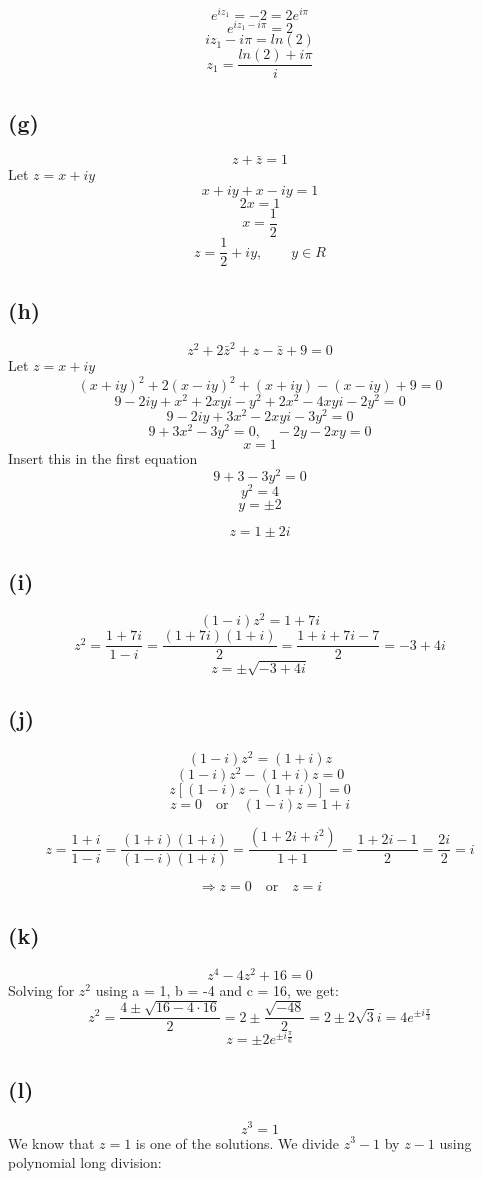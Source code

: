 \documentclass{article}
\begin{document}
\[
   e^{iz_1} = -2 = 2e^{i\pi}
\]
\[
   e^{iz_1 - i\pi} = 2
\]
\[
   iz_1 - i\pi = ln(2)
\]
\[
   z_1 = \frac{ln(2) + i\pi}{i}
\]

\subsection*{(g)}
\[
   z + \bar{z} = 1
\]
Let \(z = x + iy\)
\[
   x + iy + x - iy = 1
\]
\[
   2x = 1
\]
\[
   x = \frac{1}{2}
\]
\[
   z = \frac{1}{2} + iy, \qquad y \in R
\]

\subsection*{(h)}
\[
   z^2 + 2\bar{z}^2 + z - \bar{z} + 9 = 0
\]
Let \(z = x + iy\)
\[
   (x + iy)^2 + 2(x - iy)^2 + (x + iy) - (x - iy) + 9 = 0
\]
\[
   9 - 2iy + x^2 + 2xyi - y^2 + 2x^2 - 4xyi -2y^2 = 0
\]
\[
   9 - 2iy + 3x^2 - 2xyi - 3y^2 = 0
\]
\[
   9 + 3x^2 - 3y^2 = 0, \quad -2y - 2xy = 0
\]
\[
   x = 1
\]
Insert this in the first equation
\[
   9 + 3 - 3y^2 = 0
\]
\[
   y^2 = 4
\]
\[
   y =  \pm 2
\]

\[
   z = 1\pm2i 
\]
\subsection*{(i)}
\[(1 - i)z^2 = 1 + 7i\]
\[z^2 = \frac{1 + 7i}{1-i} = \frac{(1+7i)(1+i)}{2} = \frac{1+i+7i-7}{2} = -3+4i \]
\[z = \pm \sqrt{-3+4i}\]
\subsection*{(j)}
\[(1 - i)z^2 = (1 + i)z\]
\[
(1 - i)z^2 - (1 + i)z = 0
\]
\[
z\left[(1 - i)z - (1 + i)\right] = 0
\]
\[
z = 0 \quad \text{or} \quad (1 - i)z = 1 + i
\]

\[
z = \frac{1 + i}{1 - i} = \frac{(1 + i)(1 + i)}{(1 - i)(1 + i)} = \frac{(1 + 2i + i^2)}{1 + 1} = \frac{1 + 2i -1}{2} = \frac{2i}{2} = i
\]

\[
\Rightarrow z = 0 \quad \text{or} \quad z = i
\]
\subsection*{(k)}
\[z^4-4z^2+16=0\]
Solving for $z^2$ using a = 1, b = -4 and c = 16, we get:
\[z^2 =\frac{4\pm\sqrt{16-4\cdot16}}{2} = 2\pm\frac{\sqrt{-48}}{2} = 2\pm 2\sqrt{3} i  = 4e^{\pm i\frac{\pi}{3}}\]
\[z=\pm 2e^{\pm i\frac{\pi}{6}}\]
\subsection*{(l)}
\[z^3 = 1 \]
We know that $z=1$ is one of the solutions.
We divide \( z^3 - 1 \) by \( z - 1 \) using polynomial long division:
\end{document}
